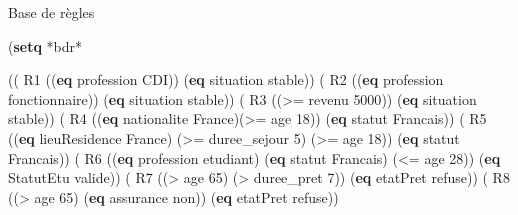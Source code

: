 \documentclass[
  ignorenonframetext,
]{beamer}
\newenvironment{Shaded}{}{}
\newcommand{\DecValTok}[1]{\textcolor[rgb]{0.25,0.63,0.44}{#1}}
\newcommand{\KeywordTok}[1]{\textcolor[rgb]{0.00,0.44,0.13}{\textbf{#1}}}
\newcommand{\NormalTok}[1]{#1}
\newcommand{\OperatorTok}[1]{\textcolor[rgb]{0.40,0.40,0.40}{#1}}
\begin{document}
\begin{frame}[fragile]{Base de règles}
\protect\hypertarget{base-de-ruxe8gles}{}
\begin{Shaded}
\begin{Highlighting}[]
\NormalTok{(}\KeywordTok{setq}\NormalTok{ *bdr*}

\NormalTok{\textquotesingle{}(( R1 ((}\KeywordTok{eq}\NormalTok{ profession CDI)) (}\KeywordTok{eq}\NormalTok{ situation stable))}
\NormalTok{( R2 ((}\KeywordTok{eq}\NormalTok{ profession fonctionnaire)) (}\KeywordTok{eq}\NormalTok{ situation stable))}
\NormalTok{( R3 ((}\OperatorTok{\textgreater{}=}\NormalTok{ revenu }\DecValTok{5000}\NormalTok{)) (}\KeywordTok{eq}\NormalTok{ situation stable))}
\NormalTok{( R4 ((}\KeywordTok{eq}\NormalTok{ nationalite France)(}\OperatorTok{\textgreater{}=}\NormalTok{ age }\DecValTok{18}\NormalTok{)) }
\NormalTok{        (}\KeywordTok{eq}\NormalTok{ statut Francais))}
\NormalTok{( R5 ((}\KeywordTok{eq}\NormalTok{ lieuResidence France) (}\OperatorTok{\textgreater{}=}\NormalTok{ duree\_sejour }\DecValTok{5}\NormalTok{) }
\NormalTok{    (}\OperatorTok{\textgreater{}=}\NormalTok{ age }\DecValTok{18}\NormalTok{)) (}\KeywordTok{eq}\NormalTok{ statut Francais))}
\NormalTok{( R6 ((}\KeywordTok{eq}\NormalTok{ profession etudiant) (}\KeywordTok{eq}\NormalTok{ statut Francais) }
\NormalTok{    (}\OperatorTok{\textless{}=}\NormalTok{ age }\DecValTok{28}\NormalTok{)) (}\KeywordTok{eq}\NormalTok{ StatutEtu valide))}
\NormalTok{( R7 ((}\OperatorTok{\textgreater{}}\NormalTok{ age }\DecValTok{65}\NormalTok{) (}\OperatorTok{\textgreater{}}\NormalTok{ duree\_pret }\DecValTok{7}\NormalTok{)) }
\NormalTok{        (}\KeywordTok{eq}\NormalTok{ etatPret refuse))}
\NormalTok{( R8 ((}\OperatorTok{\textgreater{}}\NormalTok{ age }\DecValTok{65}\NormalTok{) (}\KeywordTok{eq}\NormalTok{ assurance non)) (}\KeywordTok{eq}\NormalTok{ etatPret refuse))}
\end{Highlighting}
\end{Shaded}
\end{frame}
\end{document}
